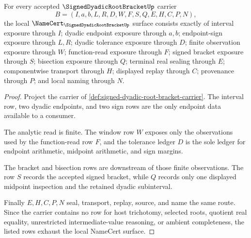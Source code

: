 \begin{theorem}
\label{thm:signed-dyadic-root-bracket-namecert-obligations}
For every accepted $\SignedDyadicRootBracketUp$ carrier
$$
B=(I,a,b,L,R,D,W,F,S,Q,E,H,C,P,N),
$$
the local $\NameCert_{\SignedDyadicRootBracketUp}$ surface consists exactly of interval exposure through $I$; dyadic endpoint exposure through $a,b$; endpoint-sign exposure through $L,R$; dyadic tolerance exposure through $D$; finite observation exposure through $W$; function-read exposure through $F$; signed bracket exposure through $S$; bisection exposure through $Q$; terminal real sealing through $E$; componentwise transport through $H$; displayed replay through $C$; provenance through $P$; and local naming through $N$.
\end{theorem}
\begin{proof}
Project the carrier of \autoref{def:signed-dyadic-root-bracket-carrier}. The interval row, two dyadic endpoints, and two sign rows are the only endpoint data available to a consumer.

The analytic read is finite. The window row $W$ exposes only the observations used by the function-read row $F$, and the tolerance ledger $D$ is the sole ledger for endpoint arithmetic, midpoint arithmetic, and sign margins.

The bracket and bisection rows are downstream of those finite observations. The row $S$ records the accepted signed bracket, while $Q$ records only one displayed midpoint inspection and the retained dyadic subinterval.

Finally $E,H,C,P,N$ seal, transport, replay, source, and name the same route. Since the carrier contains no row for host trichotomy, selected roots, quotient real equality, unrestricted intermediate-value reasoning, or ambient completeness, the listed rows exhaust the local NameCert surface.
\end{proof}

